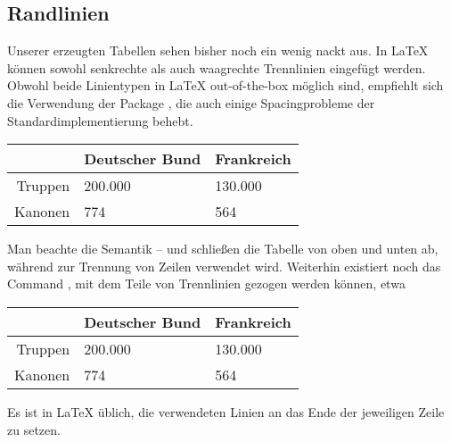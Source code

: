 \subsection{Randlinien}
Unserer erzeugten Tabellen sehen bisher noch ein wenig nackt aus.
In \LaTeX{} können sowohl senkrechte als auch waagrechte Trennlinien eingefügt werden.
Obwohl beide Linientypen in \LaTeX{} out-of-the-box möglich sind, empfiehlt sich die Verwendung der Package , die auch einige Spacingprobleme der Standardimplementierung behebt.
\begin{latexlisting}
	\begin{tabular}{r l l}
		\toprule
		& Deutscher Bund & Frankreich \\ \midrule
		Truppen & 200.000 & 130.000 \\ 
		Kanonen & 774 & 564 \\ \bottomrule
	\end{tabular}
\end{latexlisting}
Man beachte die Semantik --  und  schließen die Tabelle von oben und unten ab, während  zur Trennung von Zeilen verwendet wird.
Weiterhin existiert noch das Command , mit dem Teile von Trennlinien gezogen werden können, etwa
\begin{latexlisting}
	\begin{tabular}{r l l}
		\toprule
		& Deutscher Bund & Frankreich \\ \midrule
		Truppen & 200.000 & 130.000 \\ \cmidrule{2-3}
		Kanonen & 774 & 564 \\ \bottomrule
	\end{tabular}
\end{latexlisting}
Es ist in \LaTeX{} üblich, die verwendeten Linien an das Ende der jeweiligen Zeile zu setzen.


